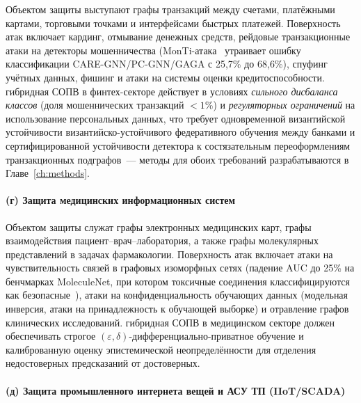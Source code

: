 Объектом защиты выступают графы транзакций между счетами,
платёжными картами, торговыми точками и интерфейсами быстрых
платежей. Поверхность атак включает кардинг, отмывание денежных
средств, рейдовые транзакционные атаки на детекторы мошенничества
(MonTi-атака~\cite{MonTi2025} утраивает ошибку классификации
CARE-GNN/PC-GNN/GAGA с 25{,}7\% до 68{,}6\%), спуфинг учётных
данных, фишинг и атаки на системы оценки кредитоспособности.
гибридная СОПВ в финтех-секторе действует в условиях
\emph{сильного дисбаланса классов} (доля мошеннических транзакций
$<\!1\%$) и \emph{регуляторных ограничений} на использование
персональных данных, что требует одновременной византийской
устойчивости византийско-устойчивого федеративного обучения между банками
и сертифицированной устойчивости детектора к состязательным
переоформлениям транзакционных подграфов~--- методы для обоих
требований разрабатываются в Главе~\ref{ch:methods}.

\paragraph{(г) Защита медицинских информационных систем}\label{subsubsec:sector_medical}

Объектом защиты служат графы электронных медицинских карт, графы
взаимодействия пациент--врач--лаборатория, а также графы
молекулярных представлений в задачах фармакологии. Поверхность атак
включает атаки на чувствительность связей в графовых изоморфных
сетях (падение AUC до 25\% на бенчмарках MoleculeNet, при котором
токсичные соединения классифицируются как
безопасные~\cite{EdgeSensitivity2025}), атаки на конфиденциальность
обучающих данных (модельная инверсия, атаки на принадлежность к
обучающей выборке) и отравление графов клинических исследований.
гибридная СОПВ в медицинском секторе должен обеспечивать строгое
$(\varepsilon,\delta)$-дифференциально-приватное обучение и калиброванную оценку эпистемической неопределённости для отделения недостоверных предсказаний от достоверных.

\paragraph{(д) Защита промышленного интернета вещей и АСУ ТП (IIoT/SCADA)}\label{subsubsec:sector_iiot}

